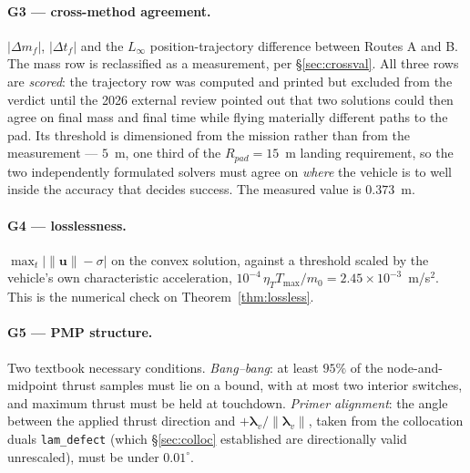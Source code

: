 \documentclass[11pt]{article}
\newcommand{\uvec}{\mathbf{u}}
\newcommand{\lamv}{\boldsymbol{\lambda}_v}
\newcommand{\Tmax}{T_{\max}}
\newcommand{\etaT}{\eta_T}
\begin{document}
\paragraph{G3 --- cross-method agreement.}
$|\Delta m_f|$, $|\Delta t_f|$ and the $L_\infty$ position-trajectory
difference between Routes A and B. The mass row is reclassified as a
measurement, per \S\ref{sec:crossval}. All three rows are \emph{scored}:
the trajectory row was computed and printed but excluded from the verdict
until the 2026 external review pointed out that two solutions could then
agree on final mass and final time while flying materially different paths
to the pad. Its threshold is dimensioned from the mission rather than from
the measurement --- $5$~m, one third of the $R_{pad} = 15$~m landing
requirement, so the two independently formulated solvers must agree on
\emph{where} the vehicle is to well inside the accuracy that decides
success. The measured value is $0.373$~m.

\paragraph{G4 --- losslessness.}
$\max_t \big|\lVert\uvec\rVert - \sigma\big|$ on the convex solution,
against a threshold scaled by the vehicle's own characteristic acceleration,
$10^{-4}\,\etaT\Tmax/m_0 = 2.45\times10^{-3}$~m/s$^2$. This is the numerical
check on Theorem~\ref{thm:lossless}.

\paragraph{G5 --- PMP structure.}
Two textbook necessary conditions. \emph{Bang--bang}: at least $95\%$ of the
node-and-midpoint thrust samples must lie on a bound, with at most two
interior switches, and maximum thrust must be held at touchdown.
\emph{Primer alignment}: the angle between the applied thrust direction and
$+\lamv/\lVert\lamv\rVert$, taken from the collocation duals
\verb|lam_defect| (which \S\ref{sec:colloc} established are directionally
valid unrescaled), must be under $0.01^\circ$.
\end{document}

